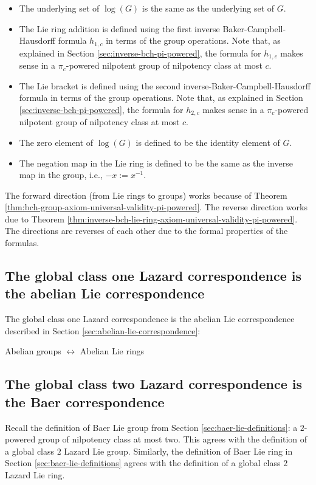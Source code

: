 \documentclass{ucetd}
\begin{document}
\begin{itemize}
\item The underlying set of $\log(G)$ is the same as the underlying set of
  $G$.
\item The Lie ring addition is defined using the first inverse
  Baker-Campbell-Hausdorff formula $h_{1,c}$ in terms of the group
  operations. Note that, as explained in Section
  \ref{sec:inverse-bch-pi-powered}, the formula for $h_{1,c}$ makes
  sense in a $\pi_c$-powered nilpotent group of nilpotency class at most
  $c$.
\item The Lie bracket is defined using the second
  inverse-Baker-Campbell-Hausdorff formula in terms of the group
  operations. Note that, as explained in Section
  \ref{sec:inverse-bch-pi-powered}, the formula for $h_{2,c}$ makes
  sense in a $\pi_c$-powered nilpotent group of nilpotency class at most
  $c$.
\item The zero element of $\log(G)$ is defined to be the identity
  element of $G$.
\item The negation map in the Lie ring is defined to be the same as
  the inverse map in the group, i.e., $-x := x^{-1}$.
\end{itemize}

The forward direction (from Lie rings to groups) works because of
Theorem \ref{thm:bch-group-axiom-universal-validity-pi-powered}. The
reverse direction works due to Theorem
\ref{thm:inverse-bch-lie-ring-axiom-universal-validity-pi-powered}. The
directions are reverses of each other due to the formal properties of
the formulas.

\subsection{The global class one Lazard correspondence is the abelian Lie correspondence}

The global class one Lazard correspondence is the abelian Lie
correspondence described in Section
\ref{sec:abelian-lie-correspondence}:

\begin{center}
  Abelian groups $\leftrightarrow$ Abelian Lie rings
\end{center}
\subsection{The global class two Lazard correspondence is the Baer correspondence}

Recall the definition of Baer Lie group from Section
\ref{sec:baer-lie-definitions}: a $2$-powered group of nilpotency
class at most two. This agrees with the definition of a global class
$2$ Lazard Lie group. Similarly, the definition of Baer Lie ring in
Section \ref{sec:baer-lie-definitions} agrees with the definition of a
global class $2$ Lazard Lie ring.
\end{document}
